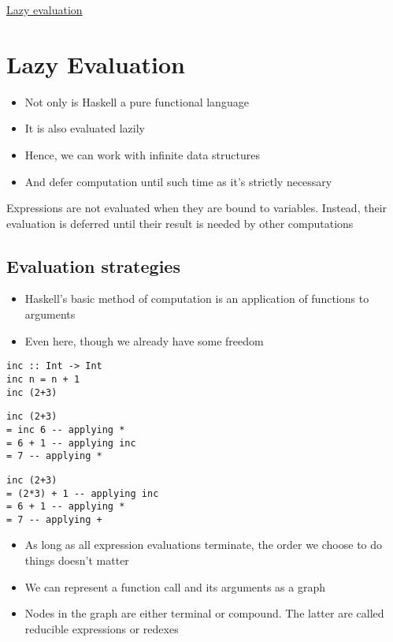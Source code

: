 \documentclass{article}[18pt]
\begin{document}
\begin{center}
\underline{\huge Lazy evaluation}
\end{center}
\section{Lazy Evaluation}
\begin{itemize}
	\item Not only is Haskell a pure functional language
	\item It is also evaluated lazily
	\item Hence, we can work with infinite data structures
	\item And defer computation until such time as it's strictly necessary
\end{itemize}
\begin{defin}
Expressions are not evaluated when they are bound to variables. Instead, their evaluation is deferred until their result is needed by other computations
\end{defin}
\subsection{Evaluation strategies}
\begin{itemize}
	\item Haskell's basic method of computation is an application of functions to arguments
	\item Even here, though we already have some freedom
\end{itemize}
\begin{verbatim}
inc :: Int -> Int
inc n = n + 1
inc (2+3)
\end{verbatim}
\begin{minipage}{0.5\textwidth}
\begin{verbatim}
inc (2+3)
= inc 6 -- applying *
= 6 + 1 -- applying inc
= 7 -- applying *
\end{verbatim}
\end{minipage}
\begin{minipage}{0.5\textwidth}
\begin{verbatim}
inc (2+3)
= (2*3) + 1 -- applying inc
= 6 + 1 -- applying *
= 7 -- applying +
\end{verbatim}
\end{minipage}
\begin{itemize}
	\item As long as all expression evaluations terminate, the order we choose to do things doesn't matter
	\item We can represent a function call and its arguments as a graph
	\item Nodes in the graph are either terminal or compound. The latter are called reducible expressions or redexes
\end{itemize}
\end{document}
